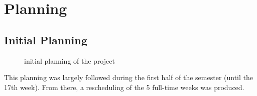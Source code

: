 \documentclass[a4paper,11pt]{report}
\begin{document}
\chapter{Planning}
\vspace{-30pt}
\section{Initial Planning}
\begin{figure}[H]
\vspace{-5pt}
\begin{center}
\vspace{-5pt}
\caption{initial planning of the project}
\end{center}
\end{figure}
\vspace{-10pt}

This planning was largely followed during the first half of the semester (until the 17th week). From there, a rescheduling of the 5 full-time weeks was produced.
\end{document}
